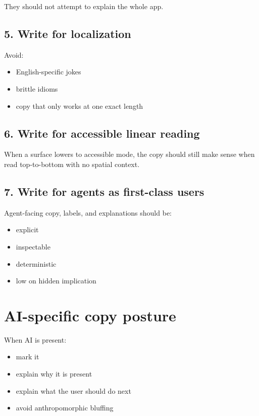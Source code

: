 They should not attempt to explain the whole app.

\subsection{5. Write for localization}\label{record-040-write-for-localization}

Avoid:

\begin{itemize}
\tightlist
\item
  English-specific jokes
\item
  brittle idioms
\item
  copy that only works at one exact length
\end{itemize}

\subsection{6. Write for accessible linear reading}\label{record-040-write-for-accessible-linear-reading}

When a surface lowers to accessible mode, the copy should still make sense when read top-to-bottom with no spatial context.

\subsection{7. Write for agents as first-class users}\label{record-040-write-for-agents-as-first-class-users}

Agent-facing copy, labels, and explanations should be:

\begin{itemize}
\tightlist
\item
  explicit
\item
  inspectable
\item
  deterministic
\item
  low on hidden implication
\end{itemize}

\section{AI-specific copy posture}\label{record-040-ai-specific-copy-posture}

When AI is present:

\begin{itemize}
\tightlist
\item
  mark it
\item
  explain why it is present
\item
  explain what the user should do next
\item
  avoid anthropomorphic bluffing
\end{itemize}

